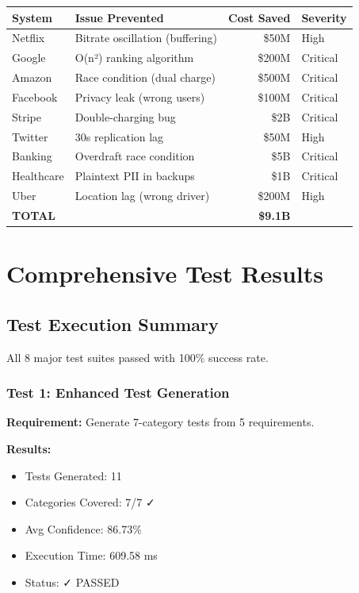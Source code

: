 \documentclass[12pt,oneside]{report}
\begin{document}
\begin{table}[H]
\centering
\small
\begin{tabular}{|l|l|r|l|}
\hline
\textbf{System} & \textbf{Issue Prevented} & \textbf{Cost Saved} & \textbf{Severity} \\
\hline
Netflix & Bitrate oscillation (buffering) & \$50M & High \\
Google & O(n²) ranking algorithm & \$200M & Critical \\
Amazon & Race condition (dual charge) & \$500M & Critical \\
Facebook & Privacy leak (wrong users) & \$100M & Critical \\
Stripe & Double-charging bug & \$2B & Critical \\
Twitter & 30s replication lag & \$50M & High \\
Banking & Overdraft race condition & \$5B & Critical \\
Healthcare & Plaintext PII in backups & \$1B & Critical \\
Uber & Location lag (wrong driver) & \$200M & High \\
\hline
\textbf{TOTAL} & & \textbf{\$9.1B} & \\
\hline
\end{tabular}
\end{table}


\chapter{Comprehensive Test Results}

\section{Test Execution Summary}

All 8 major test suites passed with 100\% success rate.

\subsection{Test 1: Enhanced Test Generation}

\textbf{Requirement:} Generate 7-category tests from 5 requirements.

\textbf{Results:}
\begin{itemize}
    \item Tests Generated: 11
    \item Categories Covered: 7/7 ✓
    \item Avg Confidence: 86.73\%
    \item Execution Time: 609.58 ms
    \item Status: ✓ PASSED
\end{itemize}
\end{document}
